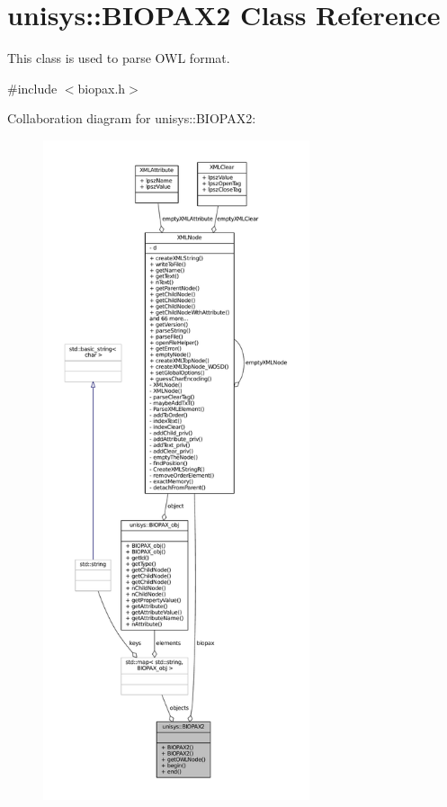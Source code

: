 \hypertarget{classunisys_1_1BIOPAX2}{\section{unisys\-:\-:B\-I\-O\-P\-A\-X2 Class Reference}
\label{classunisys_1_1BIOPAX2}
}


This class is used to parse O\-W\-L format.  




{\ttfamily \#include $<$biopax.\-h$>$}



Collaboration diagram for unisys\-:\-:B\-I\-O\-P\-A\-X2\-:
\nopagebreak
\begin{figure}[H]
\begin{center}
\leavevmode
\includegraphics[height=550pt]{classunisys_1_1BIOPAX2__coll__graph}
\end{center}
\end{figure}
